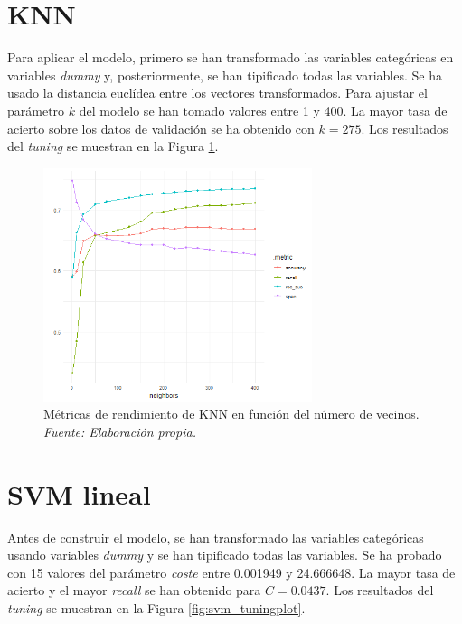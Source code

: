 \documentclass[12pt,a4paper,]{book}
\newcounter{dummy}
\numberwithin{dummy}{section}
\theoremstyle{ocrenumbox}
\theoremstyle{blacknumex}
\theoremstyle{blacknumbox}
\theoremstyle{ocrenum}
\theoremstyle{ocrenum}
\begin{document}
\hypertarget{knn}{%
\section{KNN}\label{knn}}

Para aplicar el modelo, primero se han transformado las variables
categóricas en variables \emph{dummy} y, posteriormente, se han
tipificado todas las variables. Se ha usado la distancia euclídea entre
los vectores transformados. Para ajustar el parámetro \(k\) del modelo
se han tomado valores entre 1 y 400. La mayor tasa de acierto sobre los
datos de validación se ha obtenido con \(k = 275\). Los resultados del
\emph{tuning} se muestran en la Figura \ref{fig:knn_tuningplot}.

\begin{figure}[h!]
\centering
\includegraphics[width =0.7\textwidth]{graficos/knn_tuningplot.png}
\caption[Métricas de rendimiento de KNN en función de $k$]{Métricas de rendimiento de KNN en función del número de vecinos. \it Fuente: Elaboración propia.}
\label{fig:knn_tuningplot}
\end{figure}

\hypertarget{svm-lineal}{%
\section{SVM lineal}\label{svm-lineal}}

Antes de construir el modelo, se han transformado las variables
categóricas usando variables \emph{dummy} y se han tipificado todas las
variables. Se ha probado con 15 valores del parámetro \emph{coste} entre
0.001949 y 24.666648. La mayor tasa de acierto y el mayor \emph{recall}
se han obtenido para \(C = 0.0437\). Los resultados del \emph{tuning} se
muestran en la Figura \ref{fig:svm_tuningplot}.
\end{document}
